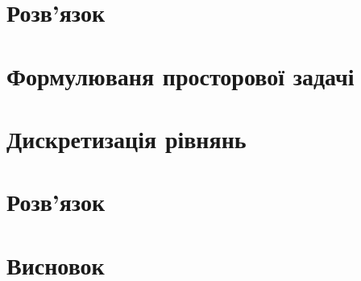 \section{Розв'язок}

\section{Формулюваня просторової задачі}

\section{Дискретизація рівнянь}

\section{Розв'язок}

\section{Висновок}
